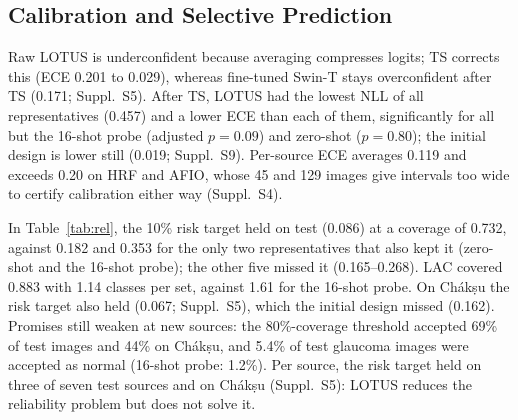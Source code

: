 \documentclass[runningheads]{llncs}
\newcommand{\sups}[1]{Suppl.~S#1}
\begin{document}
\subsection{Calibration and Selective Prediction}\label{sec:rel}
\begin{table}[tb]
\caption{Reliability after TS on the published split for LOTUS and seven representatives of Table~\ref{tab:main} covering the probe, zero-shot, DG, fine-tuning and weight-interpolation families; thresholds and quantiles fitted on Cal-B. Cov.~80: threshold for 80\% coverage, with coverage, risk, and rates of glaucoma and DR images accepted as normal (over all images of the class). Risk 10: selective-risk bound of 10\%. LAC: nominal 0.90, with mean set size. Ch\'ak\d{s}u has no D images.}\label{tab:rel}
\centering\scriptsize\setlength{\tabcolsep}{1.9pt}
\end{table}

Raw LOTUS is underconfident because averaging compresses logits; TS corrects this (ECE 0.201 to 0.029), whereas fine-tuned Swin-T stays overconfident after TS (0.171; \sups{5}). After TS, LOTUS had the lowest NLL of all representatives (0.457) and a lower ECE than each of them, significantly for all but the 16-shot probe (adjusted $p=0.09$) and zero-shot ($p=0.80$); the initial design is lower still (0.019; \sups{9}). Per-source ECE averages 0.119 and exceeds 0.20 on HRF and AFIO, whose 45 and 129 images give intervals too wide to certify calibration either way (\sups{4}).

In Table~\ref{tab:rel}, the 10\% risk target held on test (0.086) at a coverage of 0.732, against 0.182 and 0.353 for the only two representatives that also kept it (zero-shot and the 16-shot probe); the other five missed it (0.165--0.268). LAC covered 0.883 with 1.14 classes per set, against 1.61 for the 16-shot probe. On Ch\'ak\d{s}u the risk target also held (0.067; \sups{5}), which the initial design missed (0.162). Promises still weaken at new sources: the 80\%-coverage threshold accepted 69\% of test images and 44\% on Ch\'ak\d{s}u, and 5.4\% of test glaucoma images were accepted as normal (16-shot probe: 1.2\%). Per source, the risk target held on three of seven test sources and on Ch\'ak\d{s}u (\sups{5}): LOTUS reduces the reliability problem but does not solve it.
\end{document}

